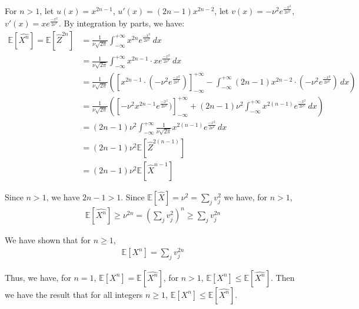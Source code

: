 For $n>1$, 
let $u(x)=x^{2n-1}$, $u'(x)=(2n-1)x^{2n-2}$,
let $v(x)=-\nu ^2e^{\frac{-x^2}{2\nu ^2}}$, $v'(x)=xe^{\frac{-x^2}{2\nu^2}}$. 
By integration by parts, we have:
\begin{align}
    \nonumber \mathbb{E}[\widehat{X^n}]=\mathbb{E}[\widehat{Z}^{2n}]&=\frac{1}{\nu\sqrt{2\pi}}\int_{-\infty }^{+\infty }x^{2n}e^{\frac{-x^2}{2\nu ^2}}\,dx \\
    \nonumber &=\frac{1}{\nu\sqrt{2\pi}}\int_{-\infty }^{+\infty }x^{2n-1}\cdot xe^{\frac{-x^2}{2\nu ^2}}\,dx \\
    \nonumber &=\frac{1}{\nu\sqrt{2\pi}}\left(\left[x^{2n-1}\cdot(-\nu ^2e^{\frac{-x^2}{2\nu ^2}})\right]_{-\infty}^{+\infty}-\int_{-\infty }^{+\infty }(2n-1)x^{2n-2}\cdot (-\nu ^2e^{\frac{-x^2}{2\nu ^2}})\,dx \right)\\
    \nonumber &=\frac{1}{\nu\sqrt{2\pi}}\left(\left[-\nu ^2x^{2n-1}e^{\frac{-x^2}{2\nu ^2}})\right]_{-\infty}^{+\infty}+(2n-1)\nu ^2\int_{-\infty }^{+\infty }x^{2(n-1)}e^{\frac{-x^2}{2\nu ^2}}\,dx \right)\\
    \nonumber &=(2n-1)\nu ^2\int_{-\infty }^{+\infty }\frac{1}{\nu\sqrt{2\pi}}x^{2(n-1)}e^{\frac{-x^2}{2\nu ^2}}\,dx \\
    \nonumber &=(2n-1)\nu ^2 \mathbb{E}[\widehat{Z}^{2(n-1)}] \\
    \nonumber &=(2n-1)\nu ^2 \mathbb{E}[\widehat{X}^{n-1}]
\end{align}

Since $n>1$, we have $2n-1>1$.
Since $\mathbb{E}[\widehat{X}]=\nu ^2=\sum_jv_j^2$ we have, for $n>1$,
\begin{align}
    \nonumber \mathbb{E}[\widehat{X^n}]\ge\nu^{2n}=(\sum_jv_j^2)^n\ge\sum_j v_j^{2n}
\end{align}

We have shown that for $n\ge 1$,
\begin{align}
    \nonumber \mathbb{E}[X^n]=\sum_j v_j^{2n}
\end{align}

Thus, we have, for $n=1$, $\mathbb{E}[X^n]=\mathbb{E}[\widehat{X^n}]$,
for $n>1$,  $\mathbb{E}[X^n]\le\mathbb{E}[\widehat{X^n}]$.
Then we have the result that for all integers $n\ge 1$, $\mathbb{E}[X^n]\le\mathbb{E}[\widehat{X^n}]$.